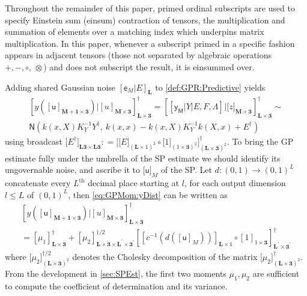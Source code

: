 \documentclass[preprint,12pt]{elsarticle}
\newcommand*{\M}[1]{\ensuremath{#1}\xspace}
\newcommand*{\x}{\times}
\newcommand*{\mi}[1]{\mathbf{#1}}
\newcommand*{\rv}[1]{\mathsf{#1}}
\newcommand*{\te}[2][]{\left\lbrack{#2}\right\rbrack_{#1}}
\newcommand*{\tte}[2][]{\lbrack{#2}\rbrack_{#1}}
\newcommand*{\deq}{\M{\mathrel{\mathop:}=}}
\newcommand*{\gauss}[2]{\mathsf{N}\!\left({#1,#2}\right)}
\begin{document}
    Throughout the remainder of this paper, primed ordinal subscripts are used to specify Einstein sum (einsum) contraction of tensors, the multiplication and summation of elements over a matching index which underpins matrix multiplication. In this paper, whenever a subscript primed in a specific fashion appears in adjacent tensors (those not separated by algebraic operations $+,-,\circ,\,\otimes$) and does not subscript the result, it is einsummed over.
    
    Adding shared Gaussian noise $\te[\mi{L}]{\rv{e}_M\vert E}$ to \cref{def:GPR:Predictive} yields
    \begin{multline}\label{eq:GPMom:yDist}
        \te[\mi{L\x 3}]{y(\te[\mi{M+1\x 3}]{\rv{u}}) \big\vert \te[\mi{M\x 3}]{u}}^{\dagger} 
        = \te[\mi{L\x 3}]{\te{\rv{y_M} \vert Y \vert E,F,\Lambda} \big\vert \tte[\mi{M\x 3}]{z}}^{\dagger} \sim \\
        \gauss{k(x,X) K_{Y}^{-1} Y^{\dagger}}{\ k(x,x) - k(x,X) K_{Y}^{-1} k(X,x) + E^{\dagger}}
    \end{multline}
    using broadcast $\tte[\mi{L3\x L3}]{E^{\dagger}} \deq \tte[(\mi{L\x 3})^{2}]{\tte[(\mi{L}\x 1)^{2}]{E} \circ \tte[(1\x\mi{3})^{2}]{1}}^{\dagger}$. 
    To bring the GP estimate fully under the umbrella of the SP estimate we should identify its ungovernable noise, and ascribe it to $\tte[M]{\rv{u}}$ of the SP.
    Let $d\colon (0,1) \to (0,1)^{L}$ concatenate every $L^{\mathrm{th}}$ decimal place starting at $l$, for each output dimension $l\leq L$ of $(0,1)^{L}$, then \cref{eq:GPMom:yDist} can be written as
    \begin{multline}\label{eq:GPMom:yReveal}
        \te[\mi{L\x 3}]{y(\te[\mi{M+1\x 3}]{\rv{u}}) \big\vert \te[\mi{M\x 3}]{u}}^{\dagger} \\
        = \te[\mi{L\x 3}]{\mu_{1}}^{\dagger}
        + \te[\mi{L\x 3\x L^{\prime}\x 3^{\prime}}]{\mu_{2}}^{\dagger/2} \te[\mi{L^{\prime}\x 3^{\prime}}]{\te[\mi{L}\x 1]{c^{-1}\!\left(d\left(\te[M]{\rv{u}}\right)\right)} \circ \te[1\x\mi{3}]{1}}^{\dagger}
    \end{multline}
    where $\tte[(\mi{L\x 3})^{2}]{\mu_{2}}^{\dagger/2}$ denotes the Cholesky decomposition of the matrix $\tte[(\mi{L\x 3})^{2}]{\mu_{2}}^{\dagger}$.
    From the development in \cref{sec:SPEst}, the first two moments $\mu_{1},\mu_{2}$ are sufficient to compute the coefficient of determination and its variance. 
    
\end{document}
